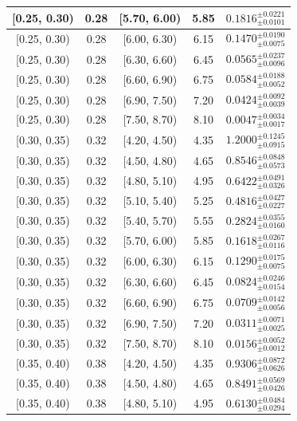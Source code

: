 \begin{longtable}{|c|c|c|c|c|}
\hline
[0.25, 0.30) & 0.28 & [5.70, 6.00) & 5.85 & $0.1816^{ \pm 0.0221 }_{ \pm 0.0101 }$ \\ 
\hline
[0.25, 0.30) & 0.28 & [6.00, 6.30) & 6.15 & $0.1470^{ \pm 0.0190 }_{ \pm 0.0075 }$ \\ 
\hline
[0.25, 0.30) & 0.28 & [6.30, 6.60) & 6.45 & $0.0565^{ \pm 0.0237 }_{ \pm 0.0096 }$ \\ 
\hline
[0.25, 0.30) & 0.28 & [6.60, 6.90) & 6.75 & $0.0584^{ \pm 0.0188 }_{ \pm 0.0052 }$ \\ 
\hline
[0.25, 0.30) & 0.28 & [6.90, 7.50) & 7.20 & $0.0424^{ \pm 0.0092 }_{ \pm 0.0039 }$ \\ 
\hline
[0.25, 0.30) & 0.28 & [7.50, 8.70) & 8.10 & $0.0047^{ \pm 0.0034 }_{ \pm 0.0017 }$ \\ 
\hline
[0.30, 0.35) & 0.32 & [4.20, 4.50) & 4.35 & $1.2000^{ \pm 0.1245 }_{ \pm 0.0915 }$ \\ 
\hline
[0.30, 0.35) & 0.32 & [4.50, 4.80) & 4.65 & $0.8546^{ \pm 0.0848 }_{ \pm 0.0573 }$ \\ 
\hline
[0.30, 0.35) & 0.32 & [4.80, 5.10) & 4.95 & $0.6422^{ \pm 0.0491 }_{ \pm 0.0326 }$ \\ 
\hline
[0.30, 0.35) & 0.32 & [5.10, 5.40) & 5.25 & $0.4816^{ \pm 0.0427 }_{ \pm 0.0227 }$ \\ 
\hline
[0.30, 0.35) & 0.32 & [5.40, 5.70) & 5.55 & $0.2824^{ \pm 0.0355 }_{ \pm 0.0160 }$ \\ 
\hline
[0.30, 0.35) & 0.32 & [5.70, 6.00) & 5.85 & $0.1618^{ \pm 0.0267 }_{ \pm 0.0116 }$ \\ 
\hline
[0.30, 0.35) & 0.32 & [6.00, 6.30) & 6.15 & $0.1290^{ \pm 0.0175 }_{ \pm 0.0075 }$ \\ 
\hline
[0.30, 0.35) & 0.32 & [6.30, 6.60) & 6.45 & $0.0824^{ \pm 0.0246 }_{ \pm 0.0154 }$ \\ 
\hline
[0.30, 0.35) & 0.32 & [6.60, 6.90) & 6.75 & $0.0709^{ \pm 0.0142 }_{ \pm 0.0056 }$ \\ 
\hline
[0.30, 0.35) & 0.32 & [6.90, 7.50) & 7.20 & $0.0311^{ \pm 0.0071 }_{ \pm 0.0025 }$ \\ 
\hline
[0.30, 0.35) & 0.32 & [7.50, 8.70) & 8.10 & $0.0156^{ \pm 0.0052 }_{ \pm 0.0012 }$ \\ 
\hline
[0.35, 0.40) & 0.38 & [4.20, 4.50) & 4.35 & $0.9306^{ \pm 0.0872 }_{ \pm 0.0626 }$ \\ 
\hline
[0.35, 0.40) & 0.38 & [4.50, 4.80) & 4.65 & $0.8491^{ \pm 0.0569 }_{ \pm 0.0426 }$ \\ 
\hline
[0.35, 0.40) & 0.38 & [4.80, 5.10) & 4.95 & $0.6130^{ \pm 0.0484 }_{ \pm 0.0294 }$ \\ 

\end{longtable}
